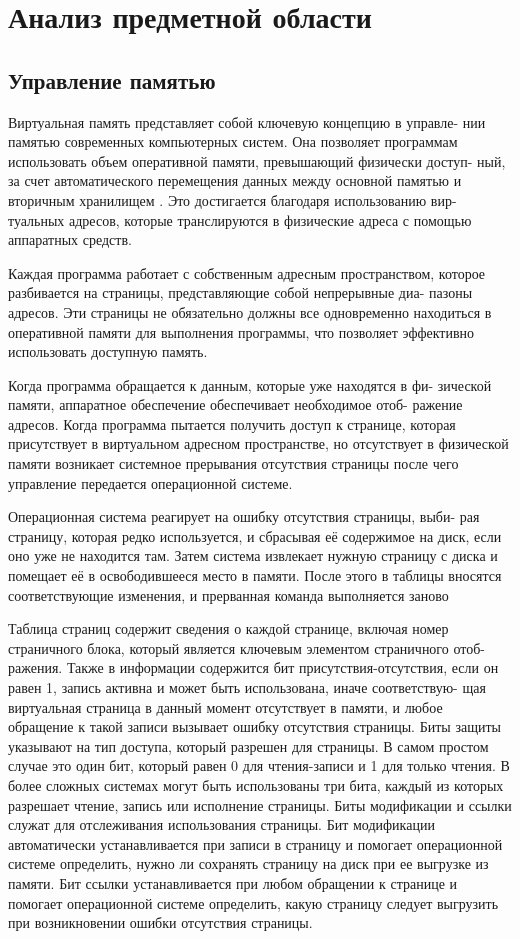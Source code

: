 \chapter{Анализ предметной области}

\section{Управление памятью}

Виртуальная память представляет собой ключевую концепцию в управле-
нии памятью современных компьютерных систем. Она позволяет программам
использовать объем оперативной памяти, превышающий физически доступ-
ный, за счет автоматического перемещения данных между основной памятью
и вторичным хранилищем . Это достигается благодаря использованию вир-
туальных адресов, которые транслируются в физические адреса с помощью
аппаратных средств.

Каждая программа работает с собственным адресным пространством,
которое разбивается на страницы, представляющие собой непрерывные диа-
пазоны адресов. Эти страницы не обязательно должны все одновременно
находиться в оперативной памяти для выполнения программы, что позволяет
эффективно использовать доступную память.

Когда программа обращается к данным, которые уже находятся в фи-
зической памяти, аппаратное обеспечение обеспечивает необходимое отоб-
ражение адресов. Когда программа пытается получить доступ к странице,
которая присутствует в виртуальном адресном пространстве, но отсутствует
в физической памяти возникает системное прерывания отсутствия страницы
после чего управление передается операционной системе.

Операционная система реагирует на ошибку отсутствия страницы, выби-
рая страницу, которая редко используется, и сбрасывая её содержимое на диск,
если оно уже не находится там. Затем система извлекает нужную страницу с
диска и помещает её в освободившееся место в памяти. После этого в таблицы
вносятся соответствующие изменения, и прерванная команда выполняется
заново

Таблица страниц содержит сведения о каждой странице, включая номер
страничного блока, который является ключевым элементом страничного отоб-
ражения. Также в информации содержится бит присутствия-отсутствия, если
он равен 1, запись активна и может быть использована, иначе соответствую-
щая виртуальная страница в данный момент отсутствует в памяти, и любое
обращение к такой записи вызывает ошибку отсутствия страницы. Биты защиты указывают на тип доступа, который разрешен для страницы. В самом
простом случае это один бит, который равен 0 для чтения-записи и 1 для
только чтения. В более сложных системах могут быть использованы три бита,
каждый из которых разрешает чтение, запись или исполнение страницы. Биты
модификации и ссылки служат для отслеживания использования страницы.
Бит модификации автоматически устанавливается при записи в страницу и
помогает операционной системе определить, нужно ли сохранять страницу
на диск при ее выгрузке из памяти. Бит ссылки устанавливается при любом
обращении к странице и помогает операционной системе определить, какую
страницу следует выгрузить при возникновении ошибки отсутствия страницы.

